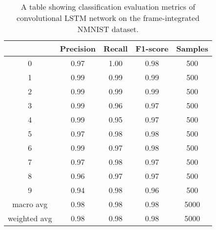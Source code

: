 \begin{table}[htb]
    \centering
    \begin{tabular}{|| c | c | c | c | c ||}
        \hline
             & Precision & Recall & F1-score & Samples \\
        \hline \hline
        0            & 0.97 & 1.00 & 0.98 & 500  \\
        \hline
        1            & 0.99 & 0.99 & 0.99 & 500  \\
        \hline
        2            & 0.99 & 0.99 & 0.99 & 500  \\
        \hline
        3            & 0.99 & 0.96 & 0.97 & 500  \\
        \hline
        4            & 0.99 & 0.95 & 0.97 & 500  \\
        \hline
        5            & 0.97 & 0.98 & 0.98 & 500  \\
        \hline
        6            & 0.99 & 0.97 & 0.98 & 500  \\
        \hline
        7            & 0.97 & 0.98 & 0.97 & 500  \\
        \hline
        8            & 0.96 & 0.97 & 0.97 & 500  \\
        \hline
        9            & 0.94 & 0.98 & 0.96 & 500  \\
        \hline
        macro avg    & 0.98 & 0.98 & 0.98 & 5000 \\
        \hline
        weighted avg & 0.98 & 0.98 & 0.98 & 5000 \\
        \hline
    \end{tabular}
    \caption{A table showing classification evaluation metrics of convolutional LSTM network on the frame-integrated NMNIST dataset.}
    \label{tab:conv_lstm_nmnist_evaluation_metrics}
\end{table}

